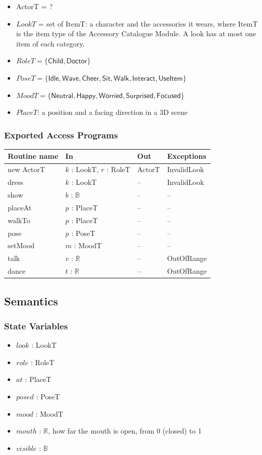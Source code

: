 \documentclass[10pt, titlepage]{article}
\newcommand{\B}{\mathbb{B}}
\newcommand{\R}{\mathbb{R}}
\newcommand{\T}[1]{\mathit{#1}}          %
\newcommand{\V}[1]{\mathsf{#1}}          %
\newenvironment{accessprogs}{%
  \begin{center}\small
  \begin{tabular}{>{\raggedright\arraybackslash}p{3.0cm}
    >{\raggedright\arraybackslash}p{5.0cm}
    >{\raggedright\arraybackslash}p{2.8cm}
    >{\raggedright\arraybackslash}p{3.4cm}}
  \toprule
  \textbf{Routine name} & \textbf{In} & \textbf{Out} & \textbf{Exceptions}\\
  \midrule}{%
  \bottomrule
  \end{tabular}
  \end{center}}
\begin{document}
\begin{itemize}
\item ActorT = ?
\item $\T{LookT}$ = set of ItemT: a character and the accessories it wears,
  where ItemT is the item type of the Accessory Catalogue Module. A look has
  at most one item of each category.
\item $\T{RoleT} = \{\V{Child}, \V{Doctor}\}$
\item $\T{PoseT} = \{\V{Idle}, \V{Wave}, \V{Cheer}, \V{Sit}, \V{Walk},
  \V{Interact}, \V{UseItem}\}$
\item $\T{MoodT} = \{\V{Neutral}, \V{Happy}, \V{Worried}, \V{Surprised},
  \V{Focused}\}$
\item $\T{PlaceT}$: a position and a facing direction in a 3D scene
\end{itemize}

\subsubsection{Exported Access Programs}

\begin{accessprogs}
new ActorT & $k$ : LookT, $r$ : RoleT & ActorT & InvalidLook\\
dress & $k$ : LookT & -- & InvalidLook\\
show & $b$ : $\B$ & -- & --\\
placeAt & $p$ : PlaceT & -- & --\\
walkTo & $p$ : PlaceT & -- & --\\
pose & $p$ : PoseT & -- & --\\
setMood & $m$ : MoodT & -- & --\\
talk & $v$ : $\R$ & -- & OutOfRange\\
dance & $t$ : $\R$ & -- & OutOfRange\\
\end{accessprogs}

\subsection{Semantics}

\subsubsection{State Variables}

\begin{itemize}
\item $\T{look}$ : LookT
\item $\T{role}$ : RoleT
\item $\T{at}$ : PlaceT
\item $\T{posed}$ : PoseT
\item $\T{mood}$ : MoodT
\item $\T{mouth}$ : $\R$, how far the mouth is open, from 0 (closed) to 1
\item $\T{visible}$ : $\B$
\end{itemize}
\end{document}
